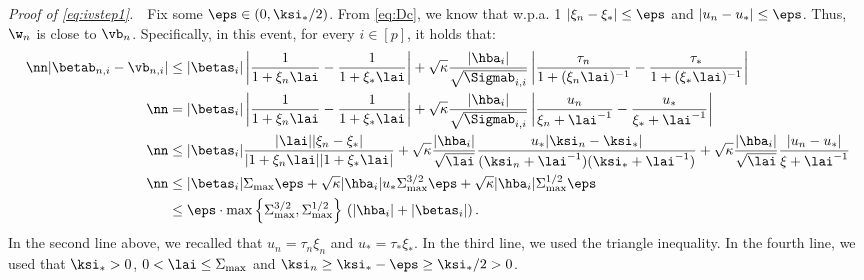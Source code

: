 \vspace{2pt}
\noindent\emph{Proof of \eqref{eq:ivstep1}.}~~Fix some $\eps\in(0,\ksi_*/2)$. From \eqref{eq:Dc}, we know that w.p.a. 1 $|\xi_n-\xi_*|\leq \eps$ and $|u_n-u_*|\leq \eps$. Thus, $\w_n$ is close to $\vb_n$. Specifically, in this event, for every $i\in[p]$, it holds that:
\begin{align}
\nn|\betab_{n,i} - \vb_{n,i}| &\leq {|\betas_i|}\left|\frac{1}{1+\xi_n\lai}-\frac{1}{1+\xi_*\lai}\right| + \sqrt{\kappa}\frac{|\hba_i|}{\sqrt{\Sigmab_{i,i}}}\left|\frac{\tau_n}{1+(\xi_n\lai)^{-1}}-\frac{\tau_*}{1+(\xi_*\lai)^{-1}}\right| \\
\nn&= {|\betas_i|}\left|\frac{1}{1+\xi_n\lai}-\frac{1}{1+\xi_*\lai}\right| + \sqrt{\kappa}\frac{|\hba_i|}{\sqrt{\Sigmab_{i,i}}}\left|\frac{u_n}{\xi_n+\lai^{-1}}-\frac{u_*}{\xi_*+\lai^{-1}}\right| \\
\nn& \leq
{|\betas_i|}\frac{|\lai||\xi_n-\xi_*|}{|1+\xi_n\lai||1+\xi_*\lai|} + \sqrt{\kappa}\frac{|\hba_i|}{\sqrt{\lai}}  \frac{u_*|\ksi_n-\ksi_*|}{(\ksi_n+\lai^{-1})(\ksi_*+\lai^{-1})} + 
\sqrt{\kappa}\frac{|\hba_i|}{\sqrt{\lai}}\frac{|u_n-u_*|}{\xi+\lai^{-1}}
\\
\nn& \leq
{|\betas_i|}{\Sigma_{\max}\eps} + \sqrt{\kappa}{|\hba_i|} u_*\Sigma_{\max}^{3/2} \eps+ 
\sqrt{\kappa}|\hba_i|\Sigma_{\max}^{1/2}\eps
\\
&\leq \eps \cdot \max\left\{\Sigma_{\max}^{3/2},\Sigma_{\max}^{1/2}\right\}\, \left(|\hba_i| + |\betas_i|\right).\label{eq:betav}
\end{align}
In the second line above, we recalled that $u_n=\tau_n\xi_n$ and $u_*=\tau_*\xi_*$. In the third line, we used the triangle inequality. In the fourth line, we used that $\ksi_*>0$, $0<\lai\leq\Sigma_{\max}$ and $\ksi_n\geq \ksi_*-\eps \geq \ksi_*/2 >0$. 

